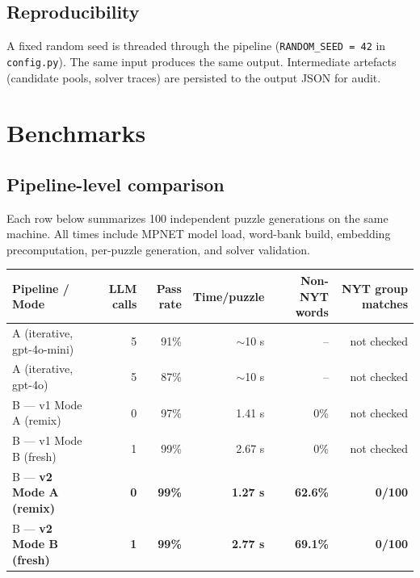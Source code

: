 \documentclass[11pt, letterpaper]{article}
\begin{document}
\subsection{Reproducibility}
A fixed random seed is threaded through the pipeline (\texttt{RANDOM\_SEED = 42}
in \texttt{config.py}). The same input produces the same output. Intermediate
artefacts (candidate pools, solver traces) are persisted to the output JSON for
audit.

\section{Benchmarks}

\subsection{Pipeline-level comparison}
Each row below summarizes 100 independent puzzle generations on the same machine.
All times include MPNET model load, word-bank build, embedding precomputation,
per-puzzle generation, and solver validation.

\begin{center}
\small
\begin{tabular}{l r r r r r}
\toprule
\textbf{Pipeline / Mode} & \textbf{LLM calls} & \textbf{Pass rate} & \textbf{Time/puzzle} & \textbf{Non-NYT words} & \textbf{NYT group matches} \\
\midrule
A  (iterative, gpt-4o-mini)   & 5 & 91\%          & $\sim$10 s   & --           & not checked \\
A  (iterative, gpt-4o)        & 5 & 87\%          & $\sim$10 s   & --           & not checked \\
B --- v1 Mode A (remix)       & 0 & 97\%          & 1.41 s       & 0\%          & not checked \\
B --- v1 Mode B (fresh)       & 1 & 99\%          & 2.67 s       & 0\%          & not checked \\
B --- \textbf{v2 Mode A (remix)} & \textbf{0} & \textbf{99\%} & \textbf{1.27 s} & \textbf{62.6\%} & \textbf{0/100} \\
B --- \textbf{v2 Mode B (fresh)} & \textbf{1} & \textbf{99\%} & \textbf{2.77 s} & \textbf{69.1\%} & \textbf{0/100} \\
\bottomrule
\end{tabular}
\end{center}
\end{document}
